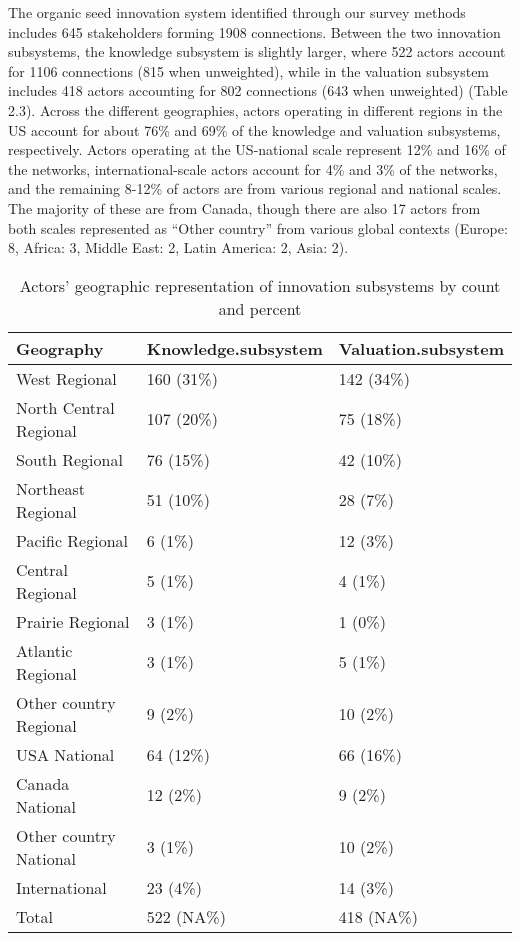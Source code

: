 \documentclass[twoside,12pt,final]{ucthesis-CA2012}
\begin{document}
\begin{ucmainmatter}
The organic seed innovation system identified through our survey methods
includes 645 stakeholders forming 1908 connections. Between the two
innovation subsystems, the knowledge subsystem is slightly larger, where
522 actors account for 1106 connections (815 when unweighted), while in
the valuation subsystem includes 418 actors accounting for 802
connections (643 when unweighted) (Table 2.3). Across the different
geographies, actors operating in different regions in the US account for
about 76\% and 69\% of the knowledge and valuation subsystems,
respectively. Actors operating at the US-national scale represent 12\%
and 16\% of the networks, international-scale actors account for 4\% and
3\% of the networks, and the remaining 8-12\% of actors are from various
regional and national scales. The majority of these are from Canada,
though there are also 17 actors from both scales represented as ``Other
country'' from various global contexts (Europe: 8, Africa: 3, Middle
East: 2, Latin America: 2, Asia: 2).
\begin{table}

\caption{\label{tab:unnamed-chunk-17}Actors' geographic representation of innovation subsystems by count and percent}
\centering
\begin{tabular}[t]{lll}
\toprule
Geography & Knowledge.subsystem & Valuation.subsystem\\
\midrule
West Regional & 160 (31\%) & 142 (34\%)\\
North Central Regional & 107 (20\%) & 75 (18\%)\\
South Regional & 76 (15\%) & 42 (10\%)\\
Northeast Regional & 51 (10\%) & 28 (7\%)\\
Pacific Regional & 6 (1\%) & 12 (3\%)\\
\addlinespace
Central Regional & 5 (1\%) & 4 (1\%)\\
Prairie Regional & 3 (1\%) & 1 (0\%)\\
Atlantic Regional & 3 (1\%) & 5 (1\%)\\
Other country Regional & 9 (2\%) & 10 (2\%)\\
USA National & 64 (12\%) & 66 (16\%)\\
\addlinespace
Canada National & 12 (2\%) & 9 (2\%)\\
Other country National & 3 (1\%) & 10 (2\%)\\
International & 23 (4\%) & 14 (3\%)\\
Total & 522 (NA\%) & 418 (NA\%)\\
\bottomrule
\end{tabular}
\end{table}
\hypertarget{ergm}{%
}
\end{ucmainmatter}
\end{document}
